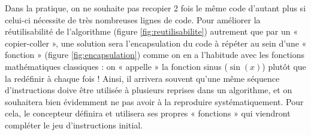 \noindent Dans la pratique, on ne souhaite pas recopier 2 fois le même code
d'autant plus si celui-ci nécessite de très nombreuses lignes de code. Pour améliorer
la réutilisabilité de l'algorithme (figure \ref{fig:reutilisabilite})
autrement que par un « copier-coller », une
solution sera l'encapsulation du code à répéter au sein d'une « fonction » 
(figure \ref{fig:encapsulation}) comme on en a l'habitude avec les fonctions mathématiques classiques : on
« appelle » la fonction sinus ($\sin(x)$) plutôt que la redéfinir à
chaque fois !
Ainsi, il arrivera souvent qu'une même séquence d'instructions doive être 
utilisée à plusieurs reprises dans un algorithme, et on souhaitera 
bien évidemment ne pas avoir à la reproduire systématiquement. 
Pour cela, le concepteur définira et utilisera ses propres « fonctions »
qui viendront compléter le jeu d'instructions initial.

